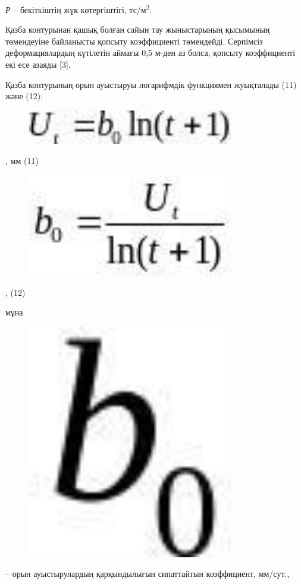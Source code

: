 \emph{Р} -- бекіткіштің жүк көтергіштігі, тс/м\textsuperscript{2}.

Қазба контурынан қашық болған сайын тау жыныстарының қысымының
төмендеуіне байланысты қопсыту коэффициенті төмендейді. Серпімсіз
деформациялардың күтілетін аймағы 0,5 м-ден аз болса, қопсыту
коэффициенті екі есе азаяды {[}3{]}.

Қазба контурының орын ауыстыруы логарифмдік функциямен жуықталады (11)
және (12):

\begin{figure}[H]
	\centering
	\includegraphics[width=0.8\textwidth]{assets/1302}
	\caption*{}
\end{figure}, мм (11)

\begin{figure}[H]
	\centering
	\includegraphics[width=0.8\textwidth]{assets/1303}
	\caption*{}
\end{figure}, (12)

мұна \begin{figure}[H]
	\centering
	\includegraphics[width=0.8\textwidth]{assets/1304}
	\caption*{}
\end{figure} -- орын ауыстырулардың
қарқындылығын сипаттайтын коэффициент, мм/сут.,

